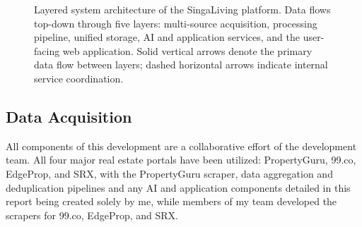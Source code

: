 \begin{figure}[!ht]
{%
}
\vspace{2pt}
\caption[Layered system architecture of the SingaLiving platform.]{Layered system architecture of the SingaLiving platform. Data flows top-down through five layers: multi-source acquisition, processing pipeline, unified storage, AI and application services, and the user-facing web application. Solid vertical arrows denote the primary data flow between layers; dashed horizontal arrows indicate internal service coordination.}
\label{fig:system_arch}
\end{figure}

\subsection{Data Acquisition}

All components of this development are a collaborative effort of the development team. All four major real estate portals have been utilized: PropertyGuru, 99.co, EdgeProp, and SRX, with the PropertyGuru scraper, data aggregation and deduplication pipelines and any AI and application components detailed in this report being created solely by me, while members of my team developed the scrapers for 99.co, EdgeProp, and SRX.

